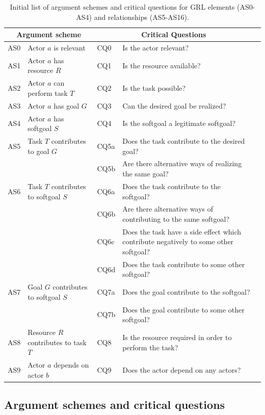 \documentclass[11.5pt,two column]{llncs}
\begin{document}
\begin{table}[h]
\centering
\begin{tabular}{|l|l|l|l|l|}
\hline
\multicolumn{2}{|c|}{\textbf{Argument scheme}} & \multicolumn{2}{c|}{\textbf{Critical Questions}}\\
\hline
AS0 & Actor $a$ is relevant & CQ0 &Is the actor relevant?\\
\hline
AS1 & Actor $a$ has resource $R$ & CQ1 &Is the resource available?\\
\hline
AS2 & Actor $a$ can perform task $T$ & CQ2 &Is the task possible?\\
\hline
AS3 & Actor $a$ has goal $G$ & CQ3 & Can the desired goal be realized?\\
\hline
AS4 & Actor $a$ has softgoal $S$ & CQ4 & Is the softgoal a legitimate softgoal?\\
\hline
\hline
AS5 & Task $T$ contributes to goal $G$ & CQ5a & Does the task contribute to the desired goal?\\
& & CQ5b & Are there alternative ways of realizing the same goal?\\
\hline
AS6 & Task $T$ contributes to softgoal $S$& CQ6a & Does the task contribute to the softgoal?\\
&& CQ6b & Are there alternative ways of contributing to the same softgoal? \\
&& CQ6c & Does the task have a side effect which contribute negatively to some other softgoal?\\
&& CQ6d & Does the task contribute to some other softgoal?\\
\hline
AS7 & Goal $G$ contributes to softgoal $S$ & CQ7a & Does the goal contribute to the softgoal?\\
&& CQ7b & Does the goal contribute to some other softgoal?\\
\hline
AS8 & Resource $R$ contributes to task $T$ & CQ8 & Is the resource required in order to perform the task?\\
\hline
AS9 & Actor $a$ depends on actor $b$ & CQ9 & Does the actor depend on any actors?\\
\hline
\end{tabular}
\caption{Initial list of argument schemes and critical questions for GRL elements (AS0-AS4) and relationships (AS5-AS16).}
\label{table:argument-schemes}
\end{table}

\subsection{Argument schemes and critical questions}
\end{document}
